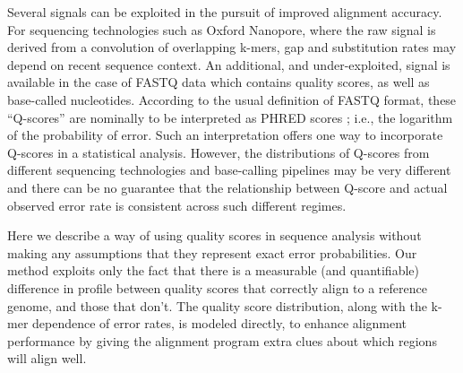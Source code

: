 \documentclass{bioinfo}
\begin{document}
Several signals can be exploited in the pursuit of improved alignment accuracy. For sequencing technologies such as Oxford Nanopore, where the raw signal is derived from a convolution of overlapping k-mers, gap and substitution rates may depend on recent sequence context.
An additional, and under-exploited, signal is available in the case of FASTQ data which contains quality scores, as well as base-called nucleotides. According to the usual definition of FASTQ format, these ``Q-scores'' are nominally to be interpreted as PHRED scores \citep{Cock2010-bk}; i.e., the logarithm of the probability of error. Such an interpretation offers one way to incorporate Q-scores in a statistical analysis.  However, the distributions of Q-scores from different sequencing technologies and base-calling pipelines may be very different \citep{Utturkar2015-vh} and there can be no guarantee that the relationship between Q-score and actual observed error rate is consistent across such different regimes.

Here we describe a way of using quality scores in sequence analysis without making any assumptions that they represent exact error probabilities. Our method exploits only the fact that there is a measurable (and quantifiable) difference in profile between quality scores that correctly align to a reference genome, and those that don't.
The quality score distribution, along with the k-mer dependence of error rates, is modeled directly, to enhance alignment performance by giving the alignment program extra clues about which regions will align well.
\end{document}
